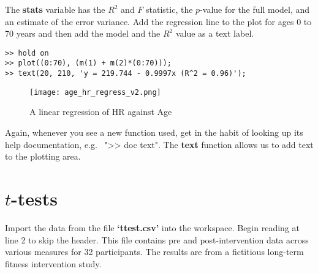 \documentclass[12pt,a4paper]{article}
\begin{document}
The \textbf{stats} variable has the $R^2$ and $F$ statistic, the $p$-value for the full model, and an estimate of the error variance.  
Add the regression line to the plot for ages 0 to 70 years and then add the model and the $R^2$ value as a text label.
\begin{lstlisting}[style=Matlab-editor]
% 'hold' axes to add plots without creating new figure
>> hold on 
>> plot((0:70), (m(1) + m(2)*(0:70)));
>> text(20, 210, 'y = 219.744 - 0.9997x (R^2 = 0.96)');
\end{lstlisting}
\begin{figure}[H]
	\begin{center}
		\texttt{[image: age\_hr\_regress\_v2.png]}
		\caption{A linear regression of HR against Age}
		\label{fig:agehr_regress}
	\end{center}
\end{figure}
Again, whenever you see a new function used, get in the habit of looking up its help documentation, e.g.~ ">> doc text".
The \textbf{text} function allows us to add text to the plotting area. 

\section{$t$-tests}
Import the data from the file \textbf{`ttest.csv'} into the workspace.  
Begin reading at line 2 to skip the header.  
This file contains pre and post-intervention data across various measures for 32 participants.  
The results are from a fictitious long-term fitness intervention study.
\end{document}
